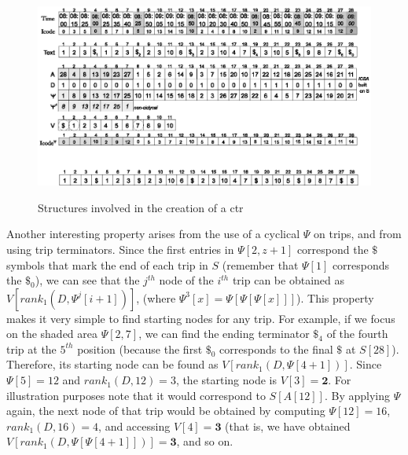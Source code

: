 
	\begin{figure}[h!]
	  \begin{center}
	  {\includegraphics[width=1.00\textwidth]{figures/csttr.eps}}
	  \end{center}
	  \caption{Structures involved in the creation of a \acrshort{ctr}}
	  \label{fig:tcsa}
	\end{figure}



	Another interesting property arises from the use of a cyclical $\Psi$ on trips, and from using trip terminators.
	Since the first entries in $\Psi[2,z+1]$ correspond the $\$$ symbols that 
	mark the end of each trip in $S$ (remember that $\Psi[1]$ corresponds the $\$_0$), we
	can see that the $j^{th}$ node of the $i^{th}$ trip can
	be obtained as $V[rank_1(D, \Psi^j[i+1])]$, (where $\Psi^3[x]= \Psi[\Psi[\Psi[x]]]$). This property
	makes it very simple to find starting nodes for any trip.
	For example, if we focus on the shaded area $\Psi[2,7]$, we can find the ending terminator $\$_4$ of the
	fourth trip at the $5^{th}$ position (because the first $\$_0$
	corresponds to the final $\$$ at $S[28]$). Therefore, its starting node can be found 
	as $V[rank_1(D, \Psi[4+1])]$. Since $\Psi[5] = 12$ and $rank_1(D,12)= 3$, 
	the starting node is $V[3]=\mathbf{2}$. For illustration purposes note that it would correspond to $S[A[12]]$.
	By applying $\Psi$ again, the next node of that trip would be obtained by computing $\Psi[12] = 16$, 
	$rank_1(D,16)=4$, and accessing $V[4]=\mathbf{3}$  (that is, we have obtained 
	 $V[rank_1(D, \Psi[\Psi[4+1]])]=\mathbf{3}$, and so on. 


